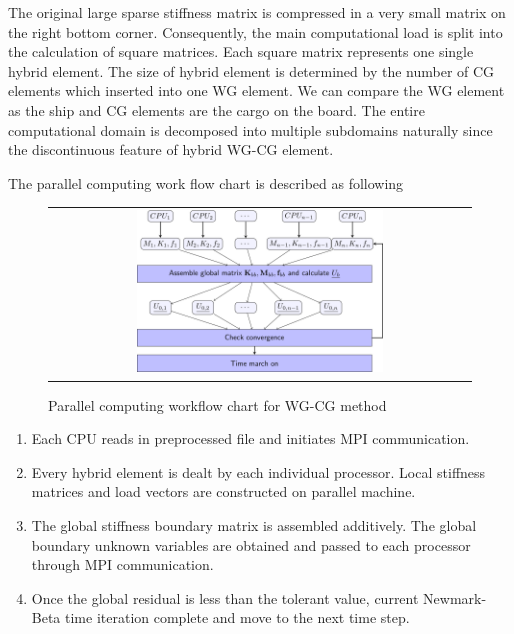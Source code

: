   The original large sparse stiffness matrix is compressed in a very small matrix on the right bottom corner. Consequently, the main computational load is split into the calculation of square matrices. Each square matrix represents one single hybrid element. The size of hybrid element is determined by the number of CG elements which inserted into one WG element. We can compare the WG element as the ship and CG elements are the cargo on the board. The entire computational domain is decomposed into multiple subdomains naturally since the discontinuous feature of hybrid WG-CG element.
  
  The parallel computing work flow chart is described as following
  
    \begin{figure}[h]
    	\centering
    	\begin{tabular}{c}
    		\includegraphics[width=0.6\textwidth]{./pics/flowchart1.png}
    	\end{tabular}
    	\caption{\footnotesize Parallel computing workflow chart for WG-CG method}
    \end{figure}
    
   \begin{enumerate}
   	\item Each CPU reads in preprocessed file and initiates MPI communication\cite{gropp1996high}.
   	\item Every hybrid element is dealt by each individual processor. Local stiffness matrices and load vectors are constructed on parallel machine.
   	\item The global stiffness boundary matrix is assembled additively. The global boundary unknown variables are obtained and passed to each processor through MPI communication.
   	\item Once the global residual is less than the tolerant value, current Newmark-Beta time iteration complete and move to the next time step.
   \end{enumerate}
   
